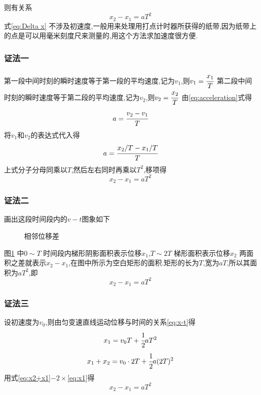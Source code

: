 则有关系
\begin{equation}
x_2-x_1=aT^2
  \label{eq:Delta x}
\end{equation}
式\eqref{eq:Delta x} 不涉及初速度,一般用来处理用打点计时器所获得的纸带,因为纸带上的点是可以用毫米刻度尺来测量的,用这个方法求加速度很方便.

\subsubsection{证法一}
第一段中间时刻的瞬时速度等于第一段的平均速度,记为$v_1$,则$v_1=\cfrac{x_1}{T}$
第二段中间时刻的瞬时速度等于第二段的平均速度,记为$v_2$,则$v_2=\cfrac{x_2}{T}$
由\eqref{eq:acceleration}式得
$$a=\cfrac{v_2-v_1}{T}$$
将$v_1$和$v_2$的表达式代入得
$$a=\cfrac{x_2/T-x_1/T}{T}$$
上式分子分母同乘以$T$,然后左右同时再乘以$T^2$,移项得
$$x_2-x_1=aT^2$$
\subsubsection{证法二}
画出这段时间段内的$v-t$图象如下
\begin{figure}[H]
  \centering
  \caption{相邻位移差}
  \label{fig:Delta xx}
\end{figure}

图\ref{fig:Delta xx} 中$0\sim T$ 时间段内梯形阴影面积表示位移$x_1$,$T\sim 2T$ 梯形面积表示位移$x_2$ 两面积之差就表示$x_2-x_1$,在图中所示为空白矩形的面积.矩形的长为$T$,宽为$aT$,所以其面积为$aT^2$,即
$$x_2-x_1=aT^2$$

\subsubsection{证法三}
设初速度为$v_0$,则由匀变速直线运动位移与时间的关系\eqref{eq:x-t}得
\begin{equation}
x_1=v_0T+\cfrac{1}{2}aT^2
  \label{eq:x1}
\end{equation}
\begin{equation}
x_1+x_2=v_0\cdot 2T+\cfrac{1}{2}a(2T)^2
  \label{eq:x2+x1}
\end{equation}
用式\eqref{eq:x2+x1}$-2\times$\eqref{eq:x1}得
$$x_2-x_1=aT^2$$

